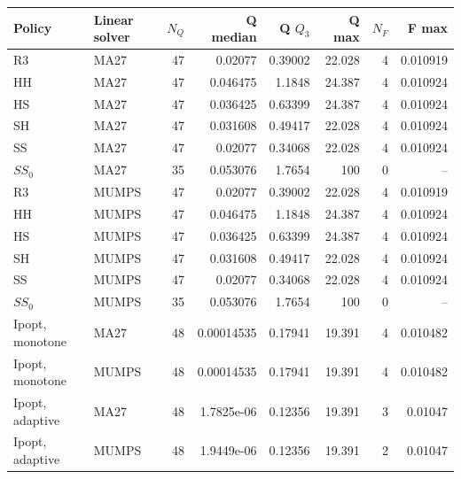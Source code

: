 \begin{tabular}{@{}llrrrrrr@{}}
\toprule
Policy & Linear solver & $N_Q$ & Q median & Q $Q_3$ & Q max & $N_F$ & F max\\
\midrule
R3 & MA27 & 47 & 0.02077 & 0.39002 & 22.028 & 4 & 0.010919\\
HH & MA27 & 47 & 0.046475 & 1.1848 & 24.387 & 4 & 0.010924\\
HS & MA27 & 47 & 0.036425 & 0.63399 & 24.387 & 4 & 0.010924\\
SH & MA27 & 47 & 0.031608 & 0.49417 & 22.028 & 4 & 0.010924\\
SS & MA27 & 47 & 0.02077 & 0.34068 & 22.028 & 4 & 0.010924\\
$SS_0$ & MA27 & 35 & 0.053076 & 1.7654 & 100 & 0 & --\\
R3 & MUMPS & 47 & 0.02077 & 0.39002 & 22.028 & 4 & 0.010919\\
HH & MUMPS & 47 & 0.046475 & 1.1848 & 24.387 & 4 & 0.010924\\
HS & MUMPS & 47 & 0.036425 & 0.63399 & 24.387 & 4 & 0.010924\\
SH & MUMPS & 47 & 0.031608 & 0.49417 & 22.028 & 4 & 0.010924\\
SS & MUMPS & 47 & 0.02077 & 0.34068 & 22.028 & 4 & 0.010924\\
$SS_0$ & MUMPS & 35 & 0.053076 & 1.7654 & 100 & 0 & --\\
Ipopt, monotone & MA27 & 48 & 0.00014535 & 0.17941 & 19.391 & 4 & 0.010482\\
Ipopt, monotone & MUMPS & 48 & 0.00014535 & 0.17941 & 19.391 & 4 & 0.010482\\
Ipopt, adaptive & MA27 & 48 & 1.7825e-06 & 0.12356 & 19.391 & 3 & 0.01047\\
Ipopt, adaptive & MUMPS & 48 & 1.9449e-06 & 0.12356 & 19.391 & 2 & 0.01047\\
\bottomrule
\end{tabular}
